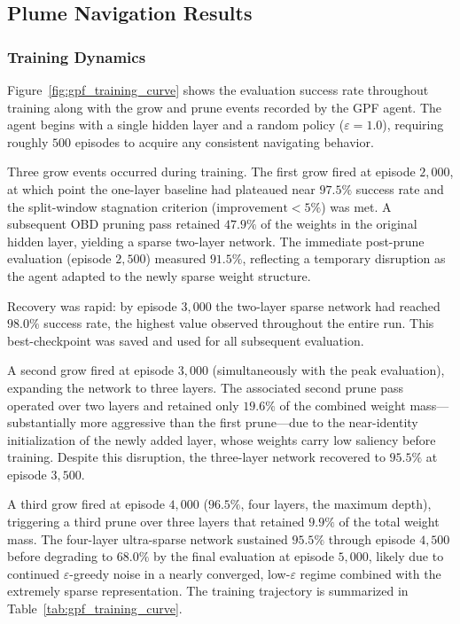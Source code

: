 
\subsection{Plume Navigation Results}

\subsubsection{Training Dynamics}

Figure~\ref{fig:gpf_training_curve} shows the evaluation success rate
throughout training along with the grow and prune events recorded by the GPF
agent.  The agent begins with a single hidden layer and a random policy
($\varepsilon = 1.0$), requiring roughly $500$ episodes to acquire any
consistent navigating behavior.

Three grow events occurred during training.  The first grow fired at
episode $2{,}000$, at which point the one-layer baseline had plateaued near
$97.5\%$ success rate and the split-window stagnation criterion
($\text{improvement} < 5\%$) was met.  A subsequent OBD pruning pass
retained $47.9\%$ of the weights in the original hidden layer, yielding a
sparse two-layer network.  The immediate post-prune evaluation
(episode $2{,}500$) measured $91.5\%$, reflecting a temporary disruption
as the agent adapted to the newly sparse weight structure.

Recovery was rapid: by episode $3{,}000$ the two-layer sparse network had
reached $\mathbf{98.0\%}$ success rate, the highest value observed throughout
the entire run.  This best-checkpoint was saved and used for all subsequent
evaluation.

A second grow fired at episode $3{,}000$ (simultaneously with the peak
evaluation), expanding the network to three layers.  The associated second
prune pass operated over two layers and retained only $19.6\%$ of the
combined weight mass—substantially more aggressive than the first prune—due
to the near-identity initialization of the newly added layer, whose weights
carry low saliency before training.  Despite this disruption, the
three-layer network recovered to $95.5\%$ at episode $3{,}500$.

A third grow fired at episode $4{,}000$ ($96.5\%$, four layers, the maximum
depth), triggering a third prune over three layers that retained $9.9\%$ of
the total weight mass.  The four-layer ultra-sparse network sustained
$95.5\%$ through episode $4{,}500$ before degrading to $68.0\%$ by the
final evaluation at episode $5{,}000$, likely due to continued
$\varepsilon$-greedy noise in a nearly converged, low-$\varepsilon$ regime
combined with the extremely sparse representation.  The training trajectory
is summarized in Table~\ref{tab:gpf_training_curve}.

